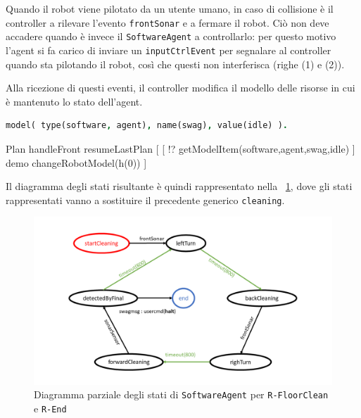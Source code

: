 \documentclass{../llncs}
\newcommand{\codescript}[1]{{\mbox{\small{\texttt{#1}}}}\xspace}
\newcommand{\code}[1]{{\color{blue}\small{\texttt{#1}}}}
\newcommand{\labelfig}[1]{\label{fig:#1}}
\newcommand{\xf}[1]{\figurename~\ref{fig:#1}}
\begin{document}
Quando il robot viene pilotato da un utente umano, in caso di collisione è il controller a rilevare l'evento \codescript{frontSonar} e a fermare il robot. Ciò non deve accadere quando è invece il \texttt{SoftwareAgent} a controllarlo: per questo motivo l'agent si fa carico di inviare un \codescript{inputCtrlEvent} per segnalare al controller quando sta pilotando il robot, così che questi non interferisca (righe (1) e (2)).

Alla ricezione di questi eventi, il controller modifica il modello delle risorse in cui è mantenuto lo stato dell'agent.\\

\begin{lstlisting}[language=Prolog, keywordstyle=\color{black}, caption={resourceModel.pl}]
% modello dell'agent
model( type(software, agent), name(swag), value(idle) ).
\end{lstlisting}

\begin{qacode}[caption={Gestione di \codescript{frontSonar} da parte del \texttt{Controller}}]
Plan handleFront resumeLastPlan [
	[ !? getModelItem(software,agent,swag,idle) ]
		demo changeRobotModel(h(0))
]
\end{qacode}

Il diagramma degli stati risultante è quindi rappresentato nella \xf{floorClean}, dove gli stati rappresentati vanno a sostituire il precedente generico \codescript{cleaning}.

\begin{figure}[!htb]
\centering
\includegraphics[scale=0.4]{img/stateDiagramCleaning.png}
\caption{Diagramma parziale degli stati di \texttt{SoftwareAgent} per \code{R-FloorClean} e \code{R-End}}\labelfig{floorClean}
\end{figure}
\end{document}
